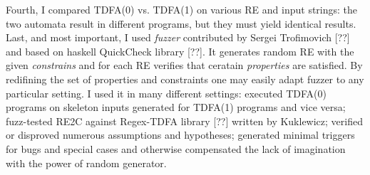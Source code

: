 \documentclass{article}
\theoremstyle{definition}
\begin{document}
\begin{multicols}{2}
Fourth, I compared TDFA(0) vs. TDFA(1) on various RE and input strings:
the two automata result in different programs, but they must yield identical results.
\\

Last, and most important, I used \emph{fuzzer} contributed by Sergei Trofimovich [??] and based on haskell QuickCheck library [??].
It generates random RE with the given \emph{constrains} and for each RE verifies that ceratain \emph{properties} are satisfied.
By redifining the set of properties and constraints one may easily adapt fuzzer to any particular setting.
I used it in many different settings:
executed TDFA(0) programs on skeleton inputs generated for TDFA(1) programs and vice versa;
fuzz-tested RE2C against Regex-TDFA library [??] written by Kuklewicz;
verified or disproved numerous assumptions and hypotheses;
generated minimal triggers for bugs and special cases
and otherwise compensated the lack of imagination with the power of random generator.
\\


\end{multicols}
\end{document}
